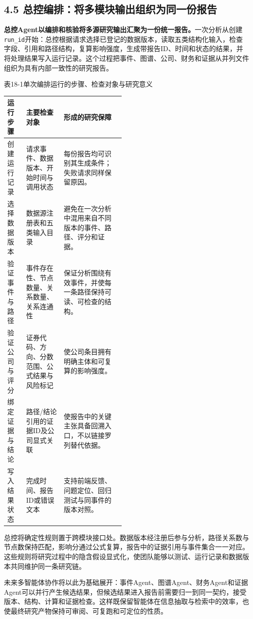 \subsection*{4.5 总控编排：将多模块输出组织为同一份报告}\label{page:18}
\noindent\textbf{总控Agent以编排和核验将多源研究输出汇聚为一份统一报告。}一次分析从创建\texttt{run\_id}开始：总控根据请求选择已登记的数据版本，读取五类结构化输入，检查字段、引用和路径结构，复算影响强度，生成带报告ID、时间和状态的结果，并将处理结果写入运行记录。这个过程把事件、图谱、公司、财务和证据从并列文件组织为具有内部一致性的研究报告\cite{lhy-orchestrator,lhy-architecture}。

\begin{center}\small 表18-1\quad 单次编排运行的步骤、检查对象与研究意义\par\vspace{1mm}
\begin{tabularx}{\linewidth}{p{0.16\linewidth}p{0.32\linewidth}X}
\toprule
运行步骤 & 主要检查对象 & 形成的研究保障\\
\midrule
创建运行记录 & 请求事件、数据版本、开始时间与调用状态 & 每份报告均可识别其生成条件；失败请求同样保留原因。\\
选择数据版本 & 数据源注册表和五类输入目录 & 避免在一次分析中混用来自不同版本的事件、路径、评分和证据。\\
验证事件与路径 & 事件存在性、节点数量、关系数量、关系连通性 & 保证分析围绕有效事件，并使每一条路径保持可读、可检查的结构。\\
验证公司与评分 & 证券代码、方向、分数范围、公式结果与风险标记 & 使公司条目拥有明确主体和可复算的影响强度。\\
绑定证据与结论 & 路径/结论引用的证据ID及公司显式关联 & 使报告中的关键主张具备回溯入口，不以链接罗列替代依据。\\
写入结果状态 & 完成时间、报告ID或错误文本 & 支持前端反馈、问题定位、回归测试与同事件的版本对照。\\
\bottomrule
\end{tabularx}\end{center}

总控将确定性规则置于跨模块接口处。数据版本经注册后参与分析，路径关系数与节点数保持匹配，影响分通过公式复算，报告中的证据引用与事件集合一一对应。这些规则将研究过程中的隐含假设显式化，使团队能够以测试、运行记录和数据版本共同维护同一条研究链\cite{lhy-contracts,lhy-orchestrator}。

未来多智能体协作将以此为基础展开：事件Agent、图谱Agent、财务Agent和证据Agent可以并行产生候选结果，但候选结果进入报告前需要归一到同一契约，接受版本、结构、计算和证据检查。这样既保留智能体在信息抽取与检索中的效率，也使最终研究产物保持可审阅、可复跑和可定位的性质。
